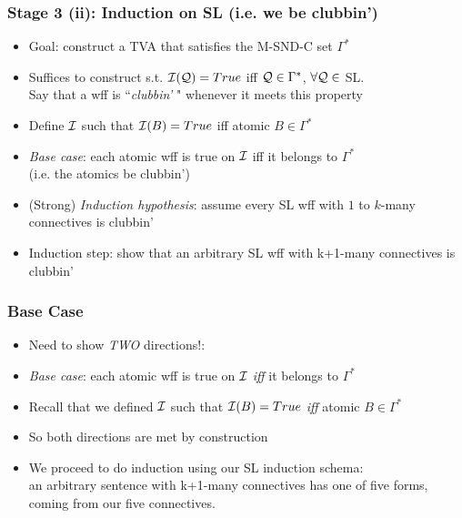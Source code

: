 \begin{frame}
\frametitle{Stage 3 (ii): Induction on SL (i.e. we be clubbin')}

\begin{itemize}[<+->]

\item Goal: construct a TVA  that satisfies the M-SND-C set $\Gamma^{\ast}$

\item[] Suffices to construct  s.t. $\mathcal{I}(\mathcal{Q}) = True$ iff $\mathcal{Q} \in \Gamma^{\ast}$, $\forall  \mathcal{Q} \in$ SL. \\ Say that a wff is ``\emph{clubbin'} " whenever it meets this property

\item Define $\mathcal{I}$ such that $\mathcal{I}(B) = True$ iff atomic $B \in \Gamma^{\ast}$

\item \emph{Base case}: each atomic wff is true on $\mathcal{I}$ iff it belongs to $\Gamma^{\ast}$ \\ (i.e. the atomics be clubbin')

\item (Strong) \emph{Induction hypothesis}: assume every SL wff with $1$ to $k$-many connectives is clubbin' 

\item Induction step: show that an arbitrary SL wff with k+1-many connectives is clubbin' 


\end{itemize}
\end{frame}

\begin{frame}
\frametitle{Base Case}

\begin{itemize}[<+->]

\item Need to show \emph{TWO} directions!: 

\item \emph{Base case}: each atomic wff is true on $\mathcal{I}$ \emph{iff} it belongs to $\Gamma^{\ast}$

\item Recall that we defined $\mathcal{I}$ such that $\mathcal{I}(B) = True$ \emph{iff} atomic $B \in \Gamma^{\ast}$

\item So both directions are met by construction 

\item We proceed to do induction using our SL induction schema: \\ an arbitrary sentence  with k+1-many connectives has one of five forms, coming from our five connectives. 

\end{itemize}
\end{frame}

